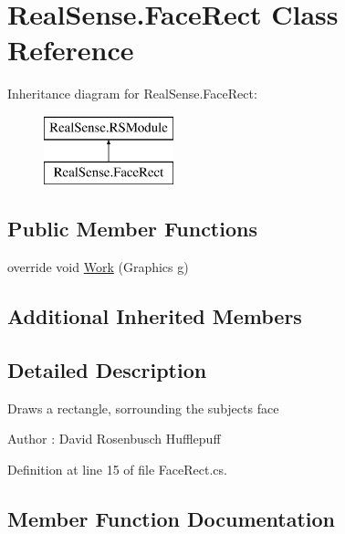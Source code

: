 \hypertarget{class_real_sense_1_1_face_rect}{}\section{Real\+Sense.\+Face\+Rect Class Reference}
\label{class_real_sense_1_1_face_rect}
Inheritance diagram for Real\+Sense.\+Face\+Rect\+:\begin{figure}[H]
\begin{center}
\leavevmode
\includegraphics[height=2.000000cm]{class_real_sense_1_1_face_rect}
\end{center}
\end{figure}
\subsection*{Public Member Functions}
\begin{DoxyCompactItemize}
\item 
override void \hyperlink{class_real_sense_1_1_face_rect_aa2dbacb2ec8ac50b8fc19d02ceba2c0a}{Work} (Graphics g)
\end{DoxyCompactItemize}
\subsection*{Additional Inherited Members}


\subsection{Detailed Description}
Draws a rectangle, sorrounding the subject\textquotesingle{}s face \begin{DoxyAuthor}{Author}
\+: David Rosenbusch  Hufflepuff 
\end{DoxyAuthor}


Definition at line 15 of file Face\+Rect.\+cs.



\subsection{Member Function Documentation}
\mbox{\label{class_real_sense_1_1_face_rect_aa2dbacb2ec8ac50b8fc19d02ceba2c0a}} 
